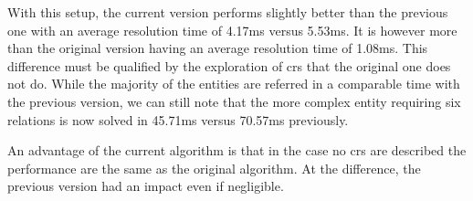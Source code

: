 With this setup, the current version performs slightly better than the previous one with an average resolution time of 4.17ms versus 5.53ms. It is however more than the original version having an average resolution time of 1.08ms. This difference must be qualified by the exploration of \acrshort{cr}s that the original one does not do. While the majority of the entities are referred in a comparable time with the previous version, we can still note that the more complex entity requiring six relations is now solved in 45.71ms versus 70.57ms previously.

An advantage of the current algorithm is that in the case no \acrshort{cr}s are described the performance are the same as the original algorithm. At the difference, the previous version had an impact even if negligible. 



